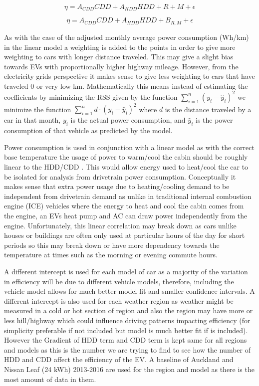 \documentclass[
]{article}
\begin{document}
\[ \eta = A_{CDD}{CDD} + A_{HDD}{HDD} + R + M + \epsilon\]

\[ \eta = A_{CDD}{CDD} + A_{HDD}{HDD} + B_{R,M} + \epsilon\]

As with the case of the adjusted monthly average power consumption
(Wh/km) in the linear model a weighting is added to the points in order
to give more weighting to cars with longer distance traveled. This may
give a slight bias towards EVs with proportionally higher highway
mileage. However, from the electricity grids perspective it makes sense
to give less weighting to cars that have traveled 0 or very low km.
Mathematically this means instead of estimating the coefficients by
minimizing the RSS given by the function
\(\sum_{i =1}^{n}(y_{i}-\hat{y}_{i})^2\) we minimize the function
\(\sum_{i =1}^{n}d \cdot(y_{i}-\hat{y}_{i})^2\) where \(d\) is the
distance traveled by a car in that month, \(y_{i}\) is the actual power
consumption, and \(\hat{y}_{i}\) is the power consumption of that
vehicle as predicted by the model.

Power consumption is used in conjunction with a linear model as with the
correct base temperature the usage of power to warm/cool the cabin
should be roughly linear to the HDD/CDD \cite{HDD_est}. This would allow
energy used to heat/cool the car to be isolated for analysis from
drivetrain power consumption. Conceptually it makes sense that extra
power usage due to heating/cooling demand to be independent from
drivetrain demand as unlike in traditional internal combustion engine
(ICE) vehicles where the energy to heat and cool the cabin comes from
the engine, an EVs heat pump and AC can draw power independently from
the engine. Unfortunately, this linear correlation may break down as
cars unlike houses or buildings are often only used at particular hours
of the day for short periods so this may break down or have more
dependency towards the temperature at times such as the morning or
evening commute hours.

A different intercept is used for each model of car as a majority of the
variation in efficiency will be due to different vehicle models,
therefore, including the vehicle model allows for much better model fit
and smaller confidence intervals. A different intercept is also used for
each weather region as weather might be measured in a cold or hot
section of region and also the region may have more or less hill/highway
which could influence driving patterns impacting efficiency (for
simplicity preferable if not included but model is much better fit if is
included). However the Gradient of HDD term and CDD term is kept same
for all regions and models as this is the number we are trying to find
to see how the number of HDD and CDD affect the efficiency of the EV. A
baseline of Auckland and Nissan Leaf (24 kWh) 2013-2016 are used for the
region and model as there is the most amount of data in them.
\end{document}
